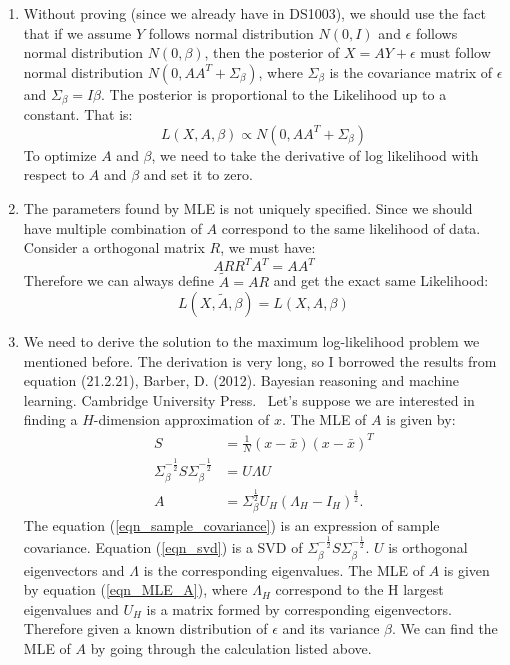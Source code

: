 \documentclass{article}
\begin{document}
\begin{enumerate}
\begin{enumerate}
\item 
Without proving (since we already have in DS1003), we should use the fact that if we assume $Y$ follows normal distribution $N(0, I)$ and $\epsilon$ follows normal distribution $N(0, \beta)$, then  the posterior of $X = AY + \epsilon$ must follow normal distribution $N(0, AA^T + \Sigma_{\beta})$, where $\Sigma_{\beta}$ is the covariance matrix of $\epsilon$ and $\Sigma_{\beta}=I\beta$. The posterior is proportional to the Likelihood up to a constant. That is:
 \begin{equation*}
 L(X, A, \beta) \propto N(0, AA^T + \Sigma_{\beta})
 \end{equation*}
 To optimize $A$ and $\beta$, we need to take the derivative of log likelihood with respect to $A$ and $\beta$ and set it to zero.
 \pagebreak
 
 \item 
 The parameters found by MLE is not uniquely specified. Since we should have multiple combination of $A$ correspond to the same likelihood of data. Consider a orthogonal matrix $R$, we must have: 
 \begin{equation}
 ARR^TA^T = AA^T
 \end{equation}
 Therefore we can always define $\tilde{A} = AR$ and get the exact same Likelihood:
 \begin{equation}
 L(X, \tilde{A}, \beta) = L(X, A , \beta)
 \end{equation}
 \pagebreak
 \item 
 We need to derive the solution to the maximum log-likelihood problem we mentioned before. The derivation is very long, so I borrowed the results from equation (21.2.21), Barber, D. (2012). Bayesian reasoning and machine learning. Cambridge University Press. \
 Let's suppose we are interested in finding a $H$-dimension approximation of $x$. The MLE of $A$ is given by:
 \begin{align}
 S &= \frac{1}{N}(x-\bar{x})(x-\bar{x})^T \label{eqn_sample_covariance} \\ 
 \Sigma_{\beta}^{-\frac{1}{2}} S \Sigma_{\beta}^{-\frac{1}{2}}&=U\Lambda U \label{eqn_svd}\\ 
 A &= \Sigma_{\beta}^{\frac{1}{2}}U_H(\Lambda_H-I_H)^{\frac{1}{2}} \label{eqn_MLE_A}.
 \end{align}
 The equation (\ref{eqn_sample_covariance}) is an expression of sample covariance. Equation (\ref{eqn_svd}) is a SVD of $ \Sigma_{\beta}^{-\frac{1}{2}} S \Sigma_{\beta}^{-\frac{1}{2}}$. $U$ is orthogonal eigenvectors and $\Lambda$ is the corresponding eigenvalues.  The MLE of $A$ is given by equation (\ref{eqn_MLE_A}), where $\Lambda_H$ correspond to the H largest eigenvalues and $U_H$ is a matrix formed by corresponding eigenvectors. \\
 Therefore given a known distribution of $\epsilon$ and its variance $\beta$. We can find the MLE of $A$ by going through the calculation listed above.
\end{enumerate}



\end{enumerate}
\end{document}

